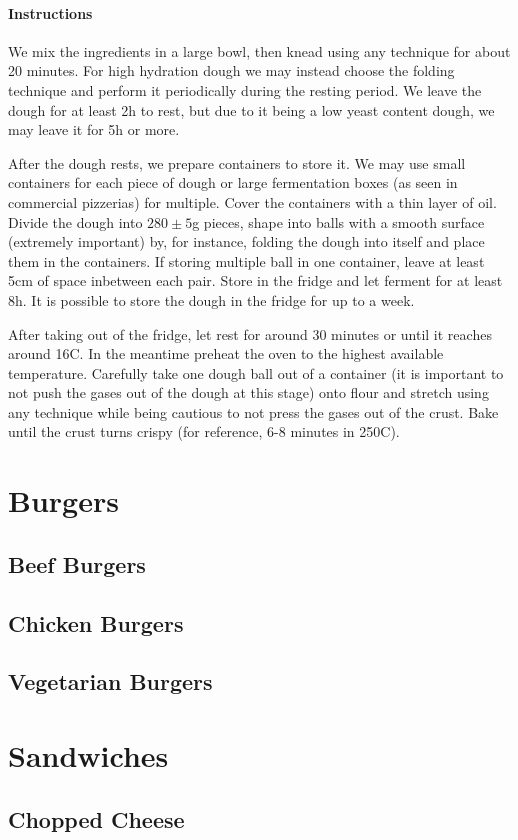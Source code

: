 \documentclass[11pt]{report}
\newcommand{\header}[1]{\subsubsection*{#1}}
\begin{document}
\header{Instructions}
We mix the ingredients in a large bowl, then knead using any technique for
about 20 minutes. For high hydration dough we may instead choose the folding
technique and perform it periodically during the resting period. We leave the
dough for at least 2h to rest, but due to it being a low yeast content dough,
we may leave it for 5h or more.

After the dough rests, we prepare containers to store it. We may use small
containers for each piece of dough or large fermentation boxes (as seen in
commercial pizzerias) for multiple. Cover the containers with a thin layer of
oil. Divide the dough into $280 \pm 5$g pieces, shape into balls with a smooth
surface (extremely important) by, for instance, folding the dough into itself
and place them in the containers. If storing multiple ball in one container,
leave at least 5cm of space inbetween each pair. Store in the fridge and let
ferment for at least 8h. It is possible to store the dough in the fridge for up
to a week.

After taking out of the fridge, let rest for around 30 minutes or until it
reaches around 16C. In the meantime preheat the oven to the highest available
temperature. Carefully take one dough ball out of a container (it is important
to not push the gases out of the dough at this stage) onto flour and stretch
using any technique while being cautious to not press the gases out of the
crust. Bake until the crust turns crispy (for reference, 6-8 minutes in 250C).

\chapter{Burgers}
\section{Beef Burgers}
\section{Chicken Burgers}
\section{Vegetarian Burgers}

\chapter{Sandwiches}
\section{Chopped Cheese}
\end{document}

